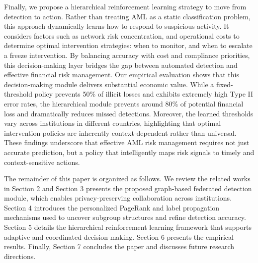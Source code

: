 \documentclass[11pt,english]{article}
\begin{document}

Finally, we propose a hierarchical reinforcement learning strategy to move from detection to action. Rather than treating AML as a static classification problem, this approach dynamically learns how to respond to suspicious activity. It considers factors such as network risk concentration, and operational costs to determine optimal intervention strategies: when to monitor, and when to escalate a freeze intervention. By balancing accuracy with cost and compliance priorities, this decision-making layer bridges the gap between automated detection and effective financial risk management. Our empirical evaluation shows that this decision-making module delivers substantial economic value. While a fixed-threshold policy prevents 50\% of illicit losses and exhibits extremely high Type II error rates, the hierarchical module prevents around 80\% of potential financial loss and dramatically reduces missed detections. Moreover, the learned thresholds vary across institutions in different countries, highlighting that optimal intervention policies are inherently context-dependent rather than universal. These findings underscore that effective AML risk management requires not just accurate prediction, but a policy that intelligently maps risk signals to timely and context-sensitive actions.

The remainder of this paper is organized as follows. We review the related works in Section 2 and Section 3 presents the proposed graph-based federated detection module, which enables privacy-preserving collaboration across institutions. Section 4 introduces the personalized PageRank and label propagation mechanisms used to uncover subgroup structures and refine detection accuracy. Section 5 details the hierarchical reinforcement learning framework that supports adaptive and coordinated decision-making. Section 6 presents the empirical results. Finally, Section 7 concludes the paper and discusses future research directions.
\end{document}
